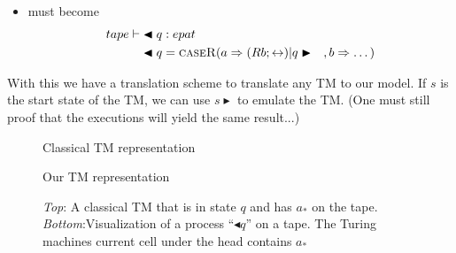 \documentclass{article}
\begin{document}
\begin{enumerate}
\begin{itemize}
			\item {} must become  
			\begin{align*}
			tape \vdash &\blacktriangleleft q : epat \\
			&\blacktriangleleft q = \textsc{caseR}( a \Rightarrow (Rb;\leftrightarrow) \vert q \blacktriangleright \quad, b \Rightarrow \dots ) 
			\end{align*}
		\end{itemize}
	\end{enumerate}
	
	
	With this we have a translation scheme to translate any TM to our model.
	If \(s\) is the start state of the TM, we can use \(s \blacktriangleright\) to emulate the TM.
	(One must still proof that the executions will yield the same result...)
	
	
	
	\begin{figure}
		\centering
		{\footnotesize Classical TM representation}
		
		\vspace{3em}
		
		
		{\footnotesize Our TM representation}
		\caption{\textit{Top}: A classical TM that is in state \(q\) and has \(a_*\) on the tape. \textit{Bottom}:Visualization of a process ``$\blacktriangleleft q$'' on a tape. The Turing machines current cell under the head contains \(a_*\)}
	\end{figure}
\end{document}
